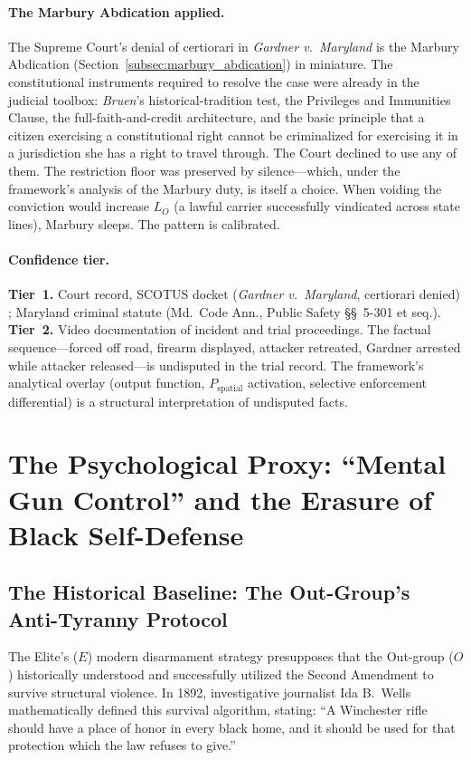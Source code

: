 \paragraph{The Marbury Abdication applied.}
The Supreme Court's denial of certiorari in \textit{Gardner v.\ Maryland} is the Marbury Abdication (Section~\ref{subsec:marbury_abdication}) in miniature. The constitutional instruments required to resolve the case were already in the judicial toolbox: \textit{Bruen}'s historical-tradition test, the Privileges and Immunities Clause, the full-faith-and-credit architecture, and the basic principle that a citizen exercising a constitutional right cannot be criminalized for exercising it in a jurisdiction she has a right to travel through. The Court declined to use any of them. The restriction floor was preserved by silence---which, under the framework's analysis of the Marbury duty, is itself a choice. When voiding the conviction would increase $L_O$ (a lawful carrier successfully vindicated across state lines), Marbury sleeps. The pattern is calibrated.

\paragraph{Confidence tier.}
\textbf{Tier~1.} Court record, SCOTUS docket (\textit{Gardner v.\ Maryland}, certiorari denied) \cite{gardner_v_maryland_2025}; Maryland criminal statute (Md.\ Code Ann., Public Safety \S\S~5-301 et seq.). \textbf{Tier~2.} Video documentation of incident and trial proceedings. The factual sequence---forced off road, firearm displayed, attacker retreated, Gardner arrested while attacker released---is undisputed in the trial record. The framework's analytical overlay (output function, $P_{\text{spatial}}$ activation, selective enforcement differential) is a structural interpretation of undisputed facts.

\section{The Psychological Proxy: ``Mental Gun Control'' and the Erasure of Black Self-Defense}

\subsection{The Historical Baseline: The Out-Group's Anti-Tyranny Protocol}
The Elite's ($E$) modern disarmament strategy presupposes that the Out-group ($O$) historically understood and successfully utilized the Second Amendment to survive structural violence. In 1892, investigative journalist Ida B.\ Wells mathematically defined this survival algorithm, stating: ``A Winchester rifle should have a place of honor in every black home, and it should be used for that protection which the law refuses to give.''

